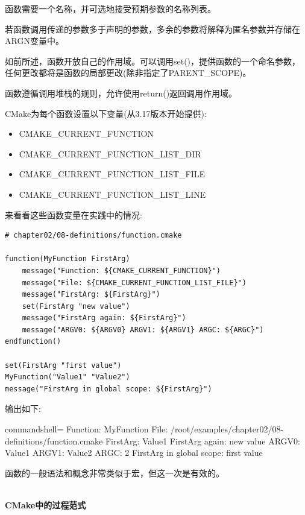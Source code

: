 函数需要一个名称，并可选地接受预期参数的名称列表。

若函数调用传递的参数多于声明的参数，多余的参数将解释为匿名参数并存储在ARGN变量中。

如前所述，函数开放自己的作用域。可以调用set()，提供函数的一个命名参数，任何更改都将是函数的局部更改(除非指定了PARENT\_SCOPE)。

函数遵循调用堆栈的规则，允许使用return()返回调用作用域。

CMake为每个函数设置以下变量(从3.17版本开始提供):

\begin{itemize}
\item 
CMAKE\_CURRENT\_FUNCTION

\item 
CMAKE\_CURRENT\_FUNCTION\_LIST\_DIR

\item 
CMAKE\_CURRENT\_FUNCTION\_LIST\_FILE

\item 
CMAKE\_CURRENT\_FUNCTION\_LIST\_LINE
\end{itemize}

来看看这些函数变量在实践中的情况:

\begin{lstlisting}[style=styleCMake]
# chapter02/08-definitions/function.cmake

function(MyFunction FirstArg)
	message("Function: ${CMAKE_CURRENT_FUNCTION}")
	message("File: ${CMAKE_CURRENT_FUNCTION_LIST_FILE}")
	message("FirstArg: ${FirstArg}")
	set(FirstArg "new value")
	message("FirstArg again: ${FirstArg}")
	message("ARGV0: ${ARGV0} ARGV1: ${ARGV1} ARGC: ${ARGC}")
endfunction()

set(FirstArg "first value")
MyFunction("Value1" "Value2")
message("FirstArg in global scope: ${FirstArg}")
\end{lstlisting}

输出如下:

\begin{tcblisting}{commandshell={}}
Function: MyFunction
File: /root/examples/chapter02/08-definitions/function.cmake
FirstArg: Value1
FirstArg again: new value
ARGV0: Value1 ARGV1: Value2 ARGC: 2
FirstArg in global scope: first value
\end{tcblisting}

函数的一般语法和概念非常类似于宏，但这一次是有效的。

\hspace*{\fill} \\ %
\noindent
\textbf{CMake中的过程范式}

